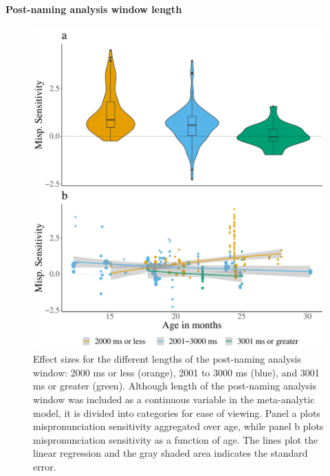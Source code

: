 \documentclass[man]{apa6}
\let\oldparagraph\paragraph
\renewcommand{\paragraph}[1]{\oldparagraph{#1}\mbox{}}
\begin{document}
\hypertarget{post-naming-analysis-window-length}{%
\paragraph{Post-naming analysis window length}\label{post-naming-analysis-window-length}}

\begin{figure}
\centering
\includegraphics{VonHolzenBergmann_MPMetaAnalysis_files/figure-latex/PlotPostNameCondAge-1.pdf}
\caption{\label{fig:PlotPostNameCondAge}Effect sizes for the different lengths of the post-naming analysis window: 2000 ms or less (orange), 2001 to 3000 ms (blue), and 3001 ms or greater (green). Although length of the post-naming analysis window was included as a continuous variable in the meta-analytic model, it is divided into categories for ease of viewing. Panel a plots mispronunciation sensitivity aggregated over age, while panel b plots mispronunciation sensitivity as a function of age. The lines plot the linear regression and the gray shaded area indicates the standard error.}
\end{figure}
\end{document}
